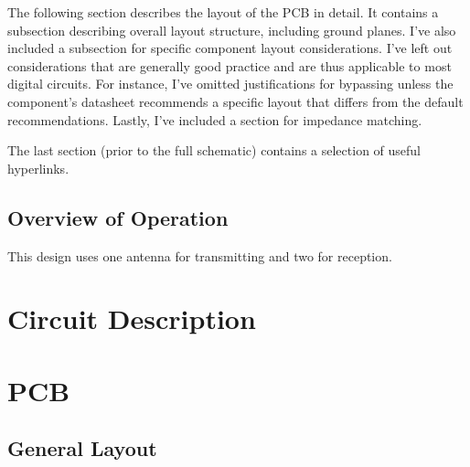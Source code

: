 \documentclass{default}
\begin{document}
The following section describes the layout of the PCB in detail. It contains a subsection describing overall layout
structure, including ground planes. I've also included a subsection for specific component layout considerations. I've
left out considerations that are generally good practice and are thus applicable to most digital circuits. For instance,
I've omitted justifications for bypassing unless the component's datasheet recommends a specific layout that differs
from the default recommendations. Lastly, I've included a section for impedance matching.

The last section (prior to the full schematic) contains a selection of useful hyperlinks.

\section{Overview of Operation}
\label{sec:overview}

This design uses one antenna for transmitting and two for reception.

\chapter{Circuit Description}
\label{cha:circuit}











\chapter{PCB}
\section{General Layout}
\end{document}
